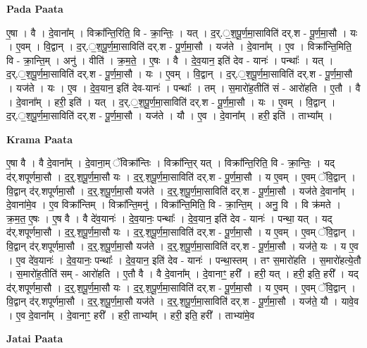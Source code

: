 \documentclass[17pt]{extarticle}
\begin{document}
\textbf{Pada Paata} \newline

ए॒षा । वै । दे॒वाना᳚म् । विक्रा᳚न्ति॒रिति॒ वि - क्रा॒न्तिः॒ । यत् । द॒र्.॒श॒पू॒र्ण॒मा॒साविति॑ दर्.श - पू॒र्ण॒मा॒सौ । यः । ए॒वम् । वि॒द्वान् । द॒र्.॒श॒पू॒र्ण॒मा॒साविति॑ दर्.श - पू॒र्ण॒मा॒सौ । यज॑ते । दे॒वाना᳚म् । ए॒व । विक्रा᳚न्ति॒मिति॒ वि - क्रा॒न्ति॒म् । अनु॑ । वीति॑ । क्र॒म॒ते॒ । ए॒षः । वै । दे॒व॒यान॒ इति॑ देव - यानः॑ । पन्थाः᳚ । यत् । द॒र्.॒श॒पू॒र्ण॒मा॒साविति॑ दर्.श - पू॒र्ण॒मा॒सौ । यः । ए॒वम् । वि॒द्वान् । द॒र्.॒श॒पू॒र्ण॒मा॒साविति॑ दर्.श - पू॒र्ण॒मा॒सौ । यज॑ते । यः । ए॒व । दे॒व॒यान॒ इति॑ देव-यानः॑ । पन्थाः᳚ । तम् । स॒मारो॑ह॒तीति॑ सं - आरो॑हति । ए॒तौ । वै । दे॒वाना᳚म् । हरी॒ इति॑ । यत् । द॒र्.॒श॒पू॒र्ण॒मा॒साविति॑ दर्.श - पू॒र्ण॒मा॒सौ । यः । ए॒वम् । वि॒द्वान् । द॒र्.॒श॒पू॒र्ण॒मा॒साविति॑ दर्.श - पू॒र्ण॒मा॒सौ । यज॑ते । यौ । ए॒व । दे॒वाना᳚म् । हरी॒ इति॑ । ताभ्या᳚म् ।  \newline


\textbf{Krama Paata} \newline

ए॒षा वै । वै दे॒वाना᳚म् । दे॒वाना॒म् ॅविक्रा᳚न्तिः । विक्रा᳚न्ति॒र् यत् । विक्रा᳚न्ति॒रिति॒ वि - क्रा॒न्तिः॒ । यद् द॑र्.शपूर्णमा॒सौ । द॒र्॒.श॒पू॒र्ण॒मा॒सौ यः । द॒र्॒.श॒पू॒र्ण॒मा॒साविति॑ दर्.श - पू॒र्ण॒मा॒सौ । य ए॒वम् । ए॒वम् ॅवि॒द्वान् । वि॒द्वान् द॑र्.शपूर्णमा॒सौ । द॒र्॒.श॒पू॒र्ण॒मा॒सौ यज॑ते । द॒र्॒.श॒पू॒र्ण॒मा॒साविति॑ दर्.श - पू॒र्ण॒मा॒सौ । यज॑ते दे॒वाना᳚म् । दे॒वाना॑मे॒व । ए॒व विक्रा᳚न्तिम् । विक्रा᳚न्ति॒मनु॑ । विक्रा᳚न्ति॒मिति॒ वि - क्रा॒न्ति॒म् । अनु॒ वि । वि क्र॑मते । क्र॒म॒त॒ ए॒षः । ए॒ष वै । वै दे॑व॒यानः॑ । दे॒व॒यानः॒ पन्थाः᳚ । दे॒व॒यान॒ इति॑ देव - यानः॑ । पन्था॒ यत् । यद् द॑र्.शपूर्णमा॒सौ । द॒र्॒.श॒पू॒र्ण॒मा॒सौ यः । द॒र्॒.श॒पू॒र्ण॒मा॒साविति॑ दर्.श - पू॒र्ण॒मा॒सौ । य ए॒वम् । ए॒वम् ॅवि॒द्वान् । वि॒द्वान् द॑र्.शपूर्णमा॒सौ । द॒र्॒.श॒पू॒र्ण॒मा॒सौ यज॑ते । द॒र्॒.श॒पू॒र्ण॒मा॒साविति॑ दर्.श - पू॒र्ण॒मा॒सौ । यज॑ते॒ यः । य ए॒व । ए॒व दे॑व॒यानः॑ । दे॒व॒यानः॒ पन्थाः᳚ । दे॒व॒यान॒ इति॑ देव - यानः॑ । पन्था॒स्तम् । तꣳ स॒मारो॑हति । स॒मारो॑हत्ये॒तौ । स॒मारो॑ह॒तीति॑ सम् - आरो॑हति । ए॒तौ वै । वै दे॒वाना᳚म् । दे॒वानाꣳ॒॒ हरी᳚ । हरी॒ यत् । हरी॒ इति॒ हरी᳚ । यद् द॑र्.शपूर्णमा॒सौ । द॒र्॒.श॒पू॒र्ण॒मा॒सौ यः । द॒र्॒.श॒पू॒र्ण॒मा॒साविति॑ दर्.श - पू॒र्ण॒मा॒सौ । य ए॒वम् । ए॒वम् ॅवि॒द्वान् । वि॒द्वान् द॑र्.शपूर्णमा॒सौ । द॒र्॒.श॒पू॒र्ण॒मा॒सौ यज॑ते । द॒र्॒.श॒पू॒र्ण॒मा॒साविति॑ दर्.श - पू॒र्ण॒मा॒सौ । यज॑ते॒ यौ । यावे॒व । ए॒व दे॒वाना᳚म् । दे॒वानाꣳ॒॒ हरी᳚ । हरी॒ ताभ्या᳚म् । हरी॒ इति॒ हरी᳚ । ताभ्या॑मे॒व \newline

\textbf{Jatai Paata} \newline
\end{document}
